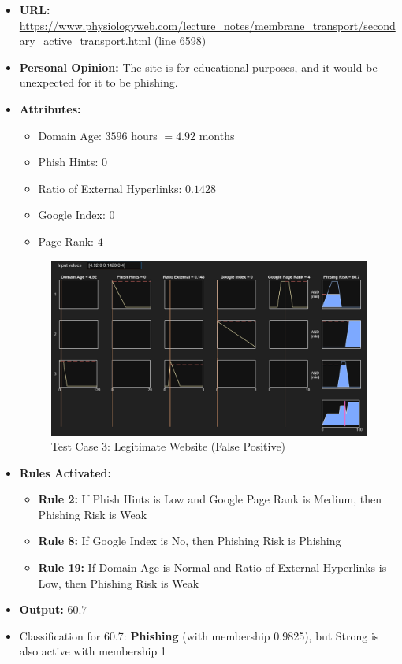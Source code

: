 \documentclass[11pt]{article}
\begin{document}
\begin{itemize}
    \item \textbf{URL:} \url{https://www.physiologyweb.com/lecture_notes/membrane_transport/secondary_active_transport.html} (line 6598)
    \item \textbf{Personal Opinion:} The site is for educational purposes, and it would be unexpected for it to be phishing. 
    \item \textbf{Attributes:}
    \begin{itemize}
        \item Domain Age: $3596$ hours $= 4.92$ months
        \item Phish Hints: $0$
        \item Ratio of External Hyperlinks: $0.1428$
        \item Google Index: $0$
        \item Page Rank: $4$
    \end{itemize}
    \begin{figure}[h!]
        \centering
        \includegraphics[width=\textwidth]{test-3.png}
        \caption{Test Case 3: Legitimate Website (False Positive)}
    \end{figure}
    \item \textbf{Rules Activated:} 
    \begin{itemize}
        \item \textbf{Rule 2:} If Phish Hints is Low and Google Page Rank is Medium, then Phishing Risk is Weak
        \item \textbf{Rule 8:} If Google Index is No, then Phishing Risk is Phishing
        \item \textbf{Rule 19:} If Domain Age is Normal and Ratio of External Hyperlinks is Low, then Phishing Risk is Weak
    \end{itemize}
    \item \textbf{Output:} $60.7$
    \item Classification for 60.7: \textbf{Phishing} (with membership 0.9825), but Strong is also active with membership 1
\end{itemize}
\end{document}
